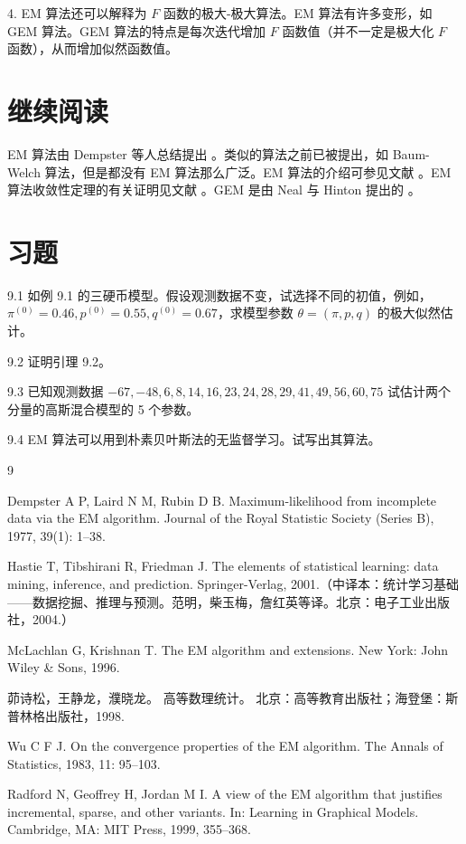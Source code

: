 \documentclass[UTF8, 12pt, fontset=fandol, oneside]{ctexart}
\begin{document}
4. EM 算法还可以解释为 $F$ 函数的极大-极大算法。EM 算法有许多变形，如 GEM 算法。GEM 算法的特点是每次迭代增加 $F$ 函数值（并不一定是极大化 $F$ 函数），从而增加似然函数值。

\section*{继续阅读}

EM 算法由 Dempster 等人总结提出 \cite{dempster1977maximum}。类似的算法之前已被提出，如 Baum-Welch 算法，但是都没有 EM 算法那么广泛。EM 算法的介绍可参见文献 \cite{hastie2001elements,mclachlan1996em,mao1998advanced}。EM 算法收敛性定理的有关证明见文献 \cite{wu1983convergence}。GEM 是由 Neal 与 Hinton 提出的 \cite{neal1999view}。

\section*{习题}

9.1 如例 9.1 的三硬币模型。假设观测数据不变，试选择不同的初值，例如，$\pi^{(0)}=0.46,p^{(0)}=0.55,q^{(0)}=0.67$，求模型参数 $\theta=(\pi,p,q)$ 的极大似然估计。

9.2 证明引理 9.2。

9.3 已知观测数据 $-67,-48,6,8,14,16,23,24,28,29,41,49,56,60,75$ 试估计两个分量的高斯混合模型的 5 个参数。

9.4 EM 算法可以用到朴素贝叶斯法的无监督学习。试写出其算法。

\begin{thebibliography}{9}

Dempster A P, Laird N M, Rubin D B.
Maximum-likelihood from incomplete data via the EM algorithm.
Journal of the Royal Statistic Society (Series B), 1977, 39(1): 1--38.

Hastie T, Tibshirani R, Friedman J.
The elements of statistical learning: data mining, inference, and prediction.
Springer-Verlag, 2001.（中译本：统计学习基础——数据挖掘、推理与预测。范明，柴玉梅，詹红英等译。北京：电子工业出版社，2004.）

McLachlan G, Krishnan T.
The EM algorithm and extensions.
New York: John Wiley \& Sons, 1996.

茆诗松，王静龙，濮晓龙。
高等数理统计。
北京：高等教育出版社；海登堡：斯普林格出版社，1998.

Wu C F J.
On the convergence properties of the EM algorithm.
The Annals of Statistics, 1983, 11: 95--103.

Radford N, Geoffrey H, Jordan M I.
A view of the EM algorithm that justifies incremental, sparse, and other variants.
In: Learning in Graphical Models.
Cambridge, MA: MIT Press, 1999, 355--368.

\end{thebibliography}
\end{document}
